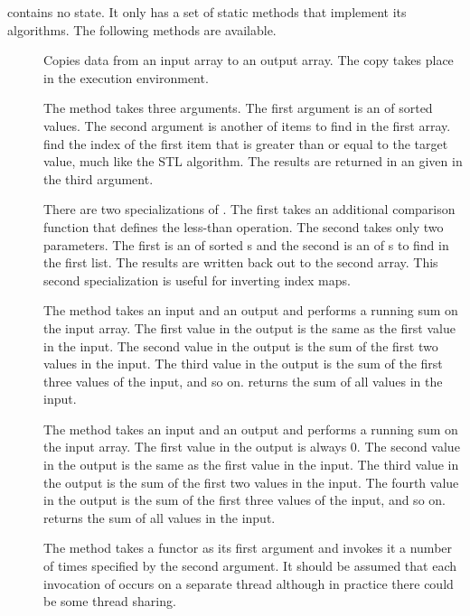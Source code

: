  contains no state. It only has a
set of static methods that implement its algorithms. The following methods
are available.

\begin{description}
\item[]  Copies data from an input array to an
  output array. The copy takes place in the execution environment.
\item[]  The
   method takes three arguments. The first argument
  is an  of sorted values. The second argument
  is another  of items to find in the first
  array.  find the index of the first item that is
  greater than or equal to the target value, much like the
   STL algorithm. The results are returned in
  an  given in the third argument.

  There are two specializations of . The first takes
  an additional comparison function that defines the less-than
  operation. The second takes only two parameters. The first is an
   of sorted s and the second is an
   of s to find in the first list. The
  results are written back out to the second array. This second
  specialization is useful for inverting index maps.
\item[]  The
   method takes an input and an output
   and performs a running sum on the input
  array. The first value in the output is the same as the first value in
  the input. The second value in the output is the sum of the first two
  values in the input. The third value in the output is the sum of the
  first three values of the input, and so on. 
  returns the sum of all values in the input.
\item[]  The
   method takes an input and an output
   and performs a running sum on the input
  array. The first value in the output is always 0. The second value in the
  output is the same as the first value in the input. The third value in
  the output is the sum of the first two values in the input. The fourth
  value in the output is the sum of the first three values of the input,
  and so on.  returns the sum of all values in the
  input.
\item[]  The  method
  takes a functor as its first argument and invokes it a number of times
  specified by the second argument. It should be assumed that each
  invocation of  occurs on a separate thread although in
  practice there could be some thread sharing.


\end{description}
